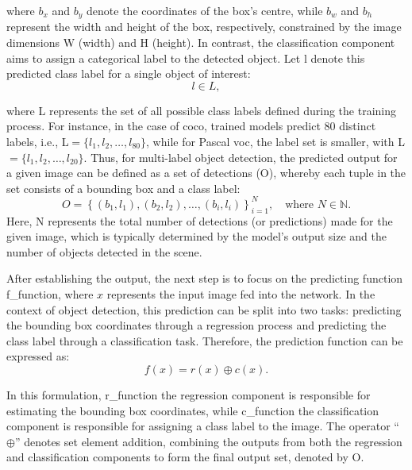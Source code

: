 \noindent where \( b_x \) and \( b_y \) denote the coordinates of the box's centre, while \( b_w \) and \( b_h \) represent the width and height of the box, respectively, constrained by the image dimensions \gls{W} (width) and \gls{H} (height).
In contrast, the classification component aims to assign a categorical label to the detected object. Let \gls{l} denote this predicted class label for a single object of interest:
\begin{equation}
\label{eq:classification_label}
l \in L,
\end{equation}

\noindent where \gls{L} represents the set of all possible class labels defined during the training process. For instance, in the case of \gls{coco}, trained models predict 80 distinct labels, i.e., \gls{L}$ = \{l_1, l_2, \dots, l_{80}\}$, while for Pascal \gls{voc}, the label set is smaller, with \gls{L}$ = \{l_1, l_2, \dots, l_{20}\}$.
Thus, for multi-label object detection, the predicted output for a given image can be defined as a set of detections (\gls{O}), whereby each tuple in the set consists of a bounding box and a class label:
\begin{equation}
\label{eq:multi_label_output}
O = \left\{ (b_1, l_1), (b_2, l_2), \ldots, (b_i, l_i) \right\}_{i=1}^{N}, \quad \text{where } N \in \mathbb{N} .
\end{equation}
Here, \gls{N} represents the total number of detections (or predictions) made for the given image, which is typically determined by the model's output size and the number of objects detected in the scene.

After establishing the output, the next step is to focus on the predicting function \gls{f_function}, where \( x \) represents the input image fed into the network. In the context of object detection, this prediction can be split into two tasks: predicting the bounding box coordinates through a regression process and predicting the class label through a classification task. Therefore, the prediction function can be expressed as:
\begin{equation}
\label{eq:prediction_function}
f(x) = r(x) \oplus c(x).
\end{equation}

In this formulation, \gls{r_function} the regression component is responsible for estimating the bounding box coordinates, while \gls{c_function} the classification component is responsible for assigning a class label to the image. The operator ``\(\oplus\)'' denotes set element addition, combining the outputs from both the regression and classification components to form the final output set, denoted by \gls{O}.

